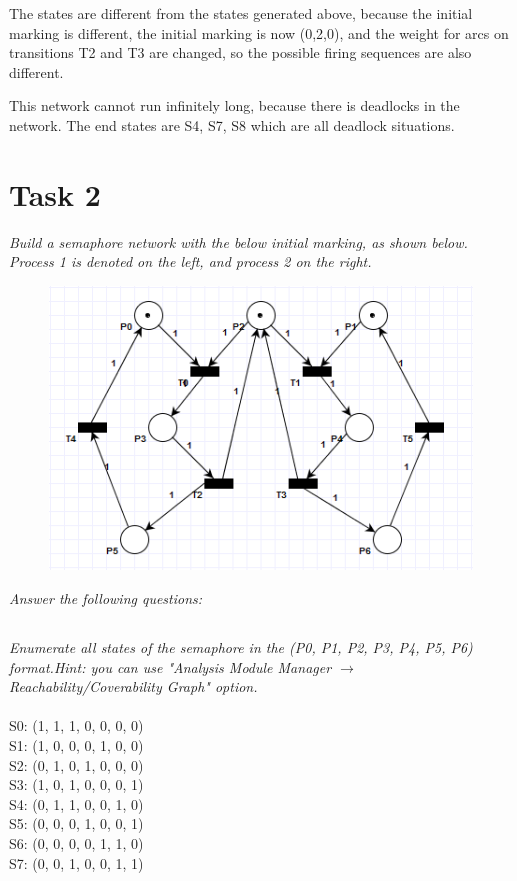 \documentclass[letterpaper]{article}
\begin{document}
The states are different from the states generated above, because the initial
marking is different, the initial marking is now (0,2,0), and the weight for arcs
on transitions T2 and T3 are changed, so the possible firing sequences are also
different.

This network cannot run infinitely long, because there is deadlocks in the network.
The end states are S4, S7, S8 which are all deadlock situations.



\section{Task 2}

\textit{Build a semaphore network with the below initial marking, as shown below. Process 1 is denoted on the left, and process 2 on the right.
}
\begin{figure}[H]
 \centering
 \includegraphics[width=\textwidth]{image3.png}
\end{figure}

\textit{Answer the following questions:}

\subsection{}
\textit{Enumerate all states of the semaphore in the (P0, P1, P2, P3, P4, P5, P6) format.Hint: you can use "Analysis Module Manager $\rightarrow$ Reachability/Coverability Graph" option.
}
\\
\\S0: (1, 1, 1, 0, 0, 0, 0)
\\S1: (1, 0, 0, 0, 1, 0, 0)
\\S2: (0, 1, 0, 1, 0, 0, 0)
\\S3: (1, 0, 1, 0, 0, 0, 1)
\\S4: (0, 1, 1, 0, 0, 1, 0)
\\S5: (0, 0, 0, 1, 0, 0, 1)
\\S6: (0, 0, 0, 0, 1, 1, 0)
\\S7: (0, 0, 1, 0, 0, 1, 1)
\end{document}
